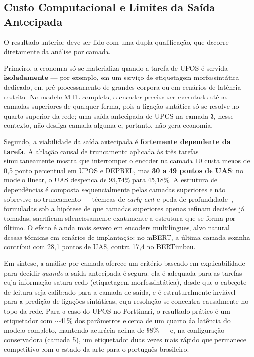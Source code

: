 \subsection{Custo Computacional e Limites da Saída Antecipada}
\label{subsec:custo_computacional}

O resultado anterior deve ser lido com uma dupla qualificação, que decorre diretamente da
análise por camada.

Primeiro, a economia só se materializa quando a tarefa de UPOS é servida
\textbf{isoladamente} --- por exemplo, em um serviço de etiquetagem morfossintática dedicado,
em pré-processamento de grandes corpora ou em cenários de latência restrita. No modelo MTL
completo, o encoder precisa ser executado até as camadas superiores de qualquer forma, pois a
ligação sintática só se resolve no quarto superior da rede; uma saída antecipada de UPOS na
camada 3, nesse contexto, não desliga camada alguma e, portanto, não gera economia.

Segundo, a viabilidade da saída antecipada é \textbf{fortemente dependente da tarefa}. A
ablação causal de truncamento aplicada às três tarefas simultaneamente mostra que interromper
o encoder na camada 10 custa menos de 0,5 ponto percentual em UPOS e DEPREL, mas
\textbf{30 a 49 pontos de UAS}: no modelo linear, o UAS despenca de 93,74\% para 45,18\%. A
estrutura de dependências é composta sequencialmente pelas camadas superiores e não sobrevive
ao truncamento --- técnicas de \textit{early exit} e poda de
profundidade~\citep{xin2020deebert, fan2020layerdrop}, formuladas sob a hipótese de que camadas
superiores apenas refinam decisões já tomadas, sacrificam silenciosamente exatamente a
estrutura que se forma por último. O efeito é ainda mais severo em encoders multilíngues, alvo
natural dessas técnicas em cenários de implantação: no mBERT, a última camada sozinha contribui
com 28,1 pontos de UAS, contra 17,4 no BERTimbau.

Em síntese, a análise por camada oferece um critério baseado em explicabilidade para decidir
\emph{quando} a saída antecipada é segura: ela é adequada para as tarefas cuja informação
satura cedo (etiquetagem morfossintática), desde que o cabeçote de leitura seja calibrado para
a camada de saída, e é estruturalmente inviável para a predição de ligações sintáticas, cuja
resolução se concentra causalmente no topo da rede. Para o caso do UPOS no Porttinari, o
resultado prático é um etiquetador com $\sim$41\% dos parâmetros e cerca de um quarto da
latência do modelo completo, mantendo acurácia acima de 98\% --- e, na configuração
conservadora (camada 5), um etiquetador duas vezes mais rápido que permanece competitivo com o
estado da arte para o português brasileiro.

